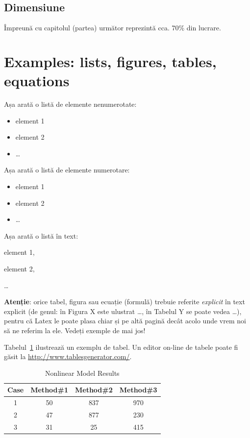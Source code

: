 \subsection{Dimensiune}

Împreună cu capitolul (partea) următor reprezintă cca. 70\% din lucrare. 


\section{Examples: lists, figures, tables, equations}

Așa arată o listă de elemente nenumerotate:
\begin{itemize}
  \item element 1
  \item element 2
  \item \dots
\end{itemize}


Așa arată o listă de elemente numerotare:
\begin{itemize}
  \item element 1
  \item element 2
  \item \dots
\end{itemize}


Așa arată o listă în text: 
\begin{inparaenum}[(\itshape 1 \upshape)]
  \item element 1, 
  \item element 2, 
  \item \dots
\end{inparaenum}

\textbf{Atenție}: orice tabel, figura sau ecuație (formulă) trebuie referite \textit{explicit} în text explicit (de genul: în Figura X este ulustrat \dots, în Tabelul Y se poate vedea \dots), pentru că Latex le poate plasa chiar și pe altă pagină decât acolo unde vrem noi să ne referim la ele. Vedeți exemple de mai jos!

Tabelul~\ref{table:example} ilustrează un exemplu de tabel. Un editor on-line de tabele poate fi găsit la \url{http://www.tablesgenerator.com/}. 

\begin{table}[t]
\centering                          %
\begin{tabular}{|c|c|c|c|}          %
\hline\hline                        %
Case & Method\#1 & Method\#2 & Method\#3 \\ [0.5ex]   %
\hline                              %
1 & 50 & 837 & 970 \\               %
2 & 47 & 877 & 230 \\
3 & 31 & 25 & 415 \\[1ex]           %
\hline                              
\end{tabular}
\caption{Nonlinear Model Results}   %
\label{table:example}                %
\end{table}

